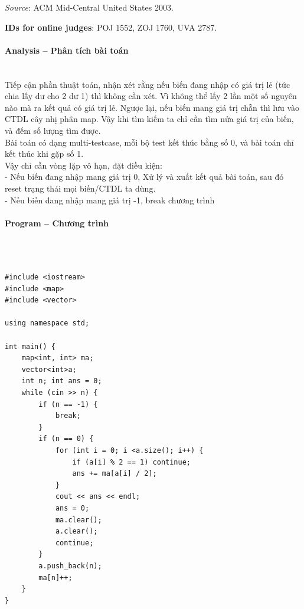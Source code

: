 \documentclass{article}
\begin{document}
\textit{Source}: ACM Mid-Central United States 2003.

\textbf{IDs for online judges}: POJ 1552, ZOJ 1760, UVA 2787.


\paragraph{Analysis -- Phân tích bài toán} \mbox{} \\

Tiếp cận phần thuật toán, nhận xét rằng nếu biến đang nhập có giá trị lẻ (tức chia lấy dư cho 2 dư 1) thì không cần xét. Vì không thể lấy 2 lần một số nguyên nào mà ra kết quả có giá trị lẻ. Ngược lại, nếu biến mang giá trị chẵn thì lưu vào CTDL cây nhị phân map. Vậy khi tìm kiếm ta chỉ cần tìm nửa giá trị của biến, và đếm số lượng tìm được. \\

Bài toán có dạng multi-testcase, mỗi bộ test kết thúc bằng số 0, và bài toán chỉ kết thúc khi gặp số 1. \\

Vậy chỉ cần vòng lặp vô hạn, đặt điều kiện: \\

- Nếu biến đang nhập mang giá trị 0, Xử lý và xuất kết quả bài toán, sau đó reset trạng thái mọi biến/CTDL ta dùng. \\
- Nếu biến đang nhập mang giá trị -1, break chương trình  

\paragraph{Program -- Chương trình} \mbox{} \\


\begin{lstlisting}

#include <iostream>
#include <map>
#include <vector>

using namespace std;

int main() {	
	map<int, int> ma;
	vector<int>a;
	int n; int ans = 0;
	while (cin >> n) {
		if (n == -1) {
			break;
		}
		if (n == 0) {
			for (int i = 0; i <a.size(); i++) {
				if (a[i] % 2 == 1) continue;
				ans += ma[a[i] / 2];
			}
			cout << ans << endl;
			ans = 0;
			ma.clear();
			a.clear();
			continue;
		}
		a.push_back(n);
		ma[n]++;
	}
}
	
\end{lstlisting}

\end{document}
